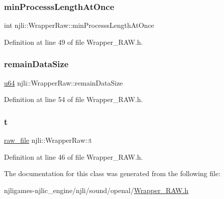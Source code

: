 \subsubsection{\texorpdfstring{min\+Processs\+Length\+At\+Once}{minProcesssLengthAtOnce}}
{\footnotesize\ttfamily int njli\+::\+Wrapper\+Raw\+::min\+Processs\+Length\+At\+Once\hspace{0.3cm}{\ttfamily [private]}}



Definition at line 49 of file Wrapper\+\_\+\+R\+A\+W.\+h.

\mbox{\label{classnjli_1_1_wrapper_raw_a99823dc02d8302ee759a206ac3263a6a}} 
\subsubsection{\texorpdfstring{remain\+Data\+Size}{remainDataSize}}
{\footnotesize\ttfamily \mbox{\hyperlink{_util_8h_ad758b7a5c3f18ed79d2fcd23d9f16357}{u64}} njli\+::\+Wrapper\+Raw\+::remain\+Data\+Size\hspace{0.3cm}{\ttfamily [private]}}



Definition at line 54 of file Wrapper\+\_\+\+R\+A\+W.\+h.

\mbox{\label{classnjli_1_1_wrapper_raw_a7ba78d8632dbe232fd0daa2e95b4aa0f}} 
\subsubsection{\texorpdfstring{t}{t}}
{\footnotesize\ttfamily \mbox{\hyperlink{structraw__file}{raw\+\_\+file}} njli\+::\+Wrapper\+Raw\+::t\hspace{0.3cm}{\ttfamily [private]}}



Definition at line 46 of file Wrapper\+\_\+\+R\+A\+W.\+h.



The documentation for this class was generated from the following file\+:\begin{DoxyCompactItemize}
\item 
njligames-\/njlic\+\_\+engine/njli/sound/openal/\mbox{\hyperlink{_wrapper___r_a_w_8h}{Wrapper\+\_\+\+R\+A\+W.\+h}}\end{DoxyCompactItemize}
